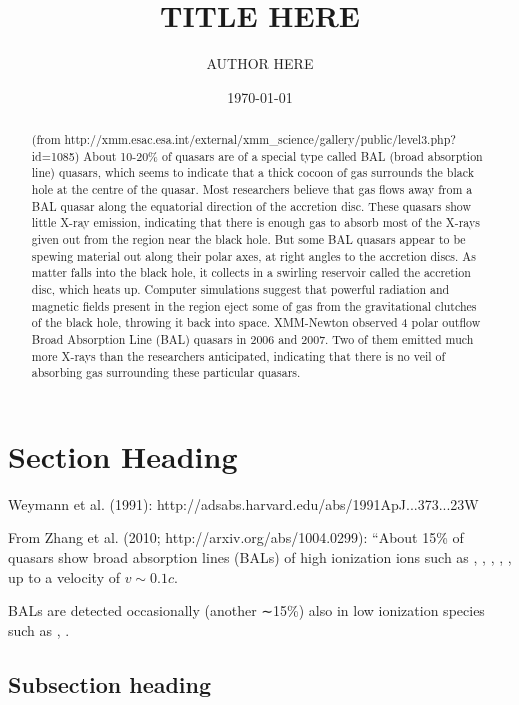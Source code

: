 \documentclass[11pt,a4paper]{article}
\begin{document}
\title{TITLE HERE}
\author{AUTHOR HERE}
\date{\today}
\maketitle



\begin{abstract}
(from http://xmm.esac.esa.int/external/xmm\_science/gallery/public/level3.php?id=1085)
 About 10-20\% of quasars are of a special type called BAL (broad absorption line) quasars, which seems to indicate that a thick cocoon of gas surrounds the black hole at the centre of the quasar. Most researchers believe that gas flows away from a BAL quasar along the equatorial direction of the accretion disc. These quasars show little X-ray emission, indicating that there is enough gas to absorb most of the X-rays given out from the region near the black hole. But some BAL quasars appear to be spewing material out along their polar axes, at right angles to the accretion discs. As matter falls into the black hole, it collects in a swirling reservoir called the accretion disc, which heats up. Computer simulations suggest that powerful radiation and magnetic fields present in the region eject some of gas from the gravitational clutches of the black hole, throwing it back into space. XMM-Newton observed 4 polar outflow Broad Absorption Line (BAL) quasars in 2006 and 2007. Two of them emitted much more X-rays than the researchers anticipated, indicating that there is no veil of absorbing gas surrounding these particular quasars.
\end{abstract}


\section{Section Heading}
Weymann et al. (1991): http://adsabs.harvard.edu/abs/1991ApJ...373...23W

From Zhang et al. (2010; http://arxiv.org/abs/1004.0299): 
``About 15\% of quasars show broad absorption lines (BALs) of high ionization ions such as \nv, \civ, \SiIV, \lya, \ovi, up to a velocity of $v\sim0.1c$. 

BALs are detected occasionally (another ∼15\%) also in low ionization species such as \mgii, \aliii. 


\subsection{Subsection heading}
\end{document}
